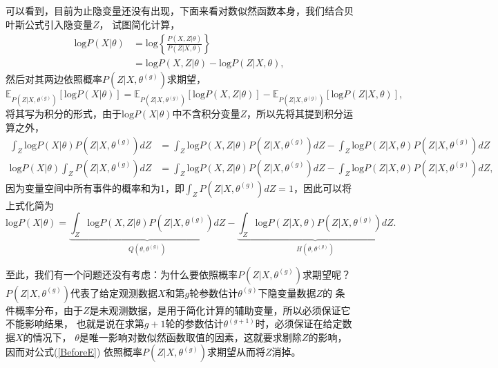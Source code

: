 \documentclass[UTF8]{ctexart}
\begin{document}
可以看到，目前为止隐变量还没有出现，下面来看对数似然函数本身，我们结合贝叶斯公式引入隐变量$Z$，
试图简化计算，
\begin{equation}\label{BeforeE}
  \begin{split}
    \mathrm{log}P(X|\theta) &= \mathrm{log} \left\{ \frac{P(X,Z|\theta)}{P(Z|X, \theta)}\right\}\\
    &= \mathrm{log}P(X,Z|\theta) - \mathrm{log}P(Z|X,\theta),
  \end{split}
\end{equation}
然后对其两边依照概率$P(Z|X,\theta^{(g)})$求期望，
\begin{equation}
  \mathbb{E}_{P(Z|X,\theta^{(g)})}\left[\mathrm{log}P(X|\theta)\right] = \mathbb{E}_{P(Z|X,\theta^{(g)})}\left[\mathrm{log}P(X,Z|\theta)\right] - \mathbb{E}_{P(Z|X,\theta^{(g)})}\left[\mathrm{log}P(Z|X,\theta)\right],
\end{equation}
将其写为积分的形式，由于$\mathrm{log}P(X|\theta)$中不含积分变量$Z$，所以先将其提到积分运算之外，
\begin{equation}\label{IntegerSimplify}
  \begin{split}
    \int_{Z}\mathrm{log}P(X|\theta)P\left(Z|X,\theta^{(g)}\right)dZ &= \int_{Z}\mathrm{log}P(X,Z|\theta)P\left(Z|X,\theta^{(g)}\right)dZ - \int_{Z}\mathrm{log}P(Z|X,\theta)P\left(Z|X,\theta^{(g)}\right)dZ\\
    \mathrm{log}P(X|\theta)\int_{Z}P\left(Z|X,\theta^{(g)}\right)dZ &= \int_{Z}\mathrm{log}P(X,Z|\theta)P\left(Z|X,\theta^{(g)}\right)dZ - \int_{Z}\mathrm{log}P(Z|X,\theta)P\left(Z|X,\theta^{(g)}\right)dZ,
  \end{split}
\end{equation}
因为变量空间中所有事件的概率和为1，即$\int_{Z}P(Z|X,\theta^{(g)})dZ = 1$，因此可以将上式化简为
\begin{equation}\label{QH}
  {\mathrm{log}P(X|\theta) = \underbrace{\int_{Z}\mathrm{log}P(X,Z|\theta)P\left(Z|X,\theta^{(g)}\right)dZ}_{Q\left(\theta,\theta^{(g)}\right)} - \underbrace{\int_{Z}\mathrm{log}P(Z|X,\theta)P\left(Z|X,\theta^{(g)}\right)dZ}_{H\left(\theta, \theta^{(g)}\right)}}.
\end{equation}

至此，我们有一个问题还没有考虑：为什么要依照概率$P(Z|X,\theta^{(g)})$求期望呢？
$P(Z|X,\theta^{(g)})$代表了给定观测数据$X$和第$g$轮参数估计$\theta^{(g)}$下隐变量数据$Z$的
条件概率分布，由于$Z$是未观测数据，是用于简化计算的辅助变量，所以必须保证它不能影响结果，
也就是说在求第$g+1$轮的参数估计$\theta^{(g+1)}$时，必须保证在给定数据$X$的情况下，
$\theta$是唯一影响对数似然函数取值的因素，这就要求剔除$Z$的影响，
因而对公式(\ref{BeforeE}) 依照概率$P(Z|X,\theta^{(g)})$求期望从而将$Z$消掉。
\end{document}
